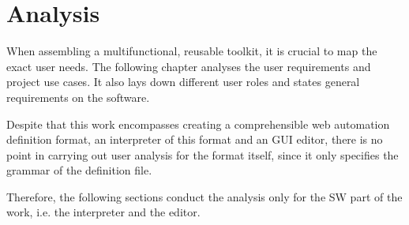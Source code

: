 \chapter{Analysis}

When assembling a multifunctional, reusable toolkit, it is crucial to map the exact user needs.
The following chapter analyses the user requirements and project use cases. 
It also lays down different user roles and states general requirements on the software.

Despite that this work encompasses creating a comprehensible web automation definition format, an interpreter of this format and an \ac{GUI} editor, 
there is no point in carrying out user analysis for the format itself, since it only specifies the grammar of the definition file. 

Therefore, the following sections conduct the analysis only for the \ac{SW} part of the work, i.e. the interpreter and the editor.







